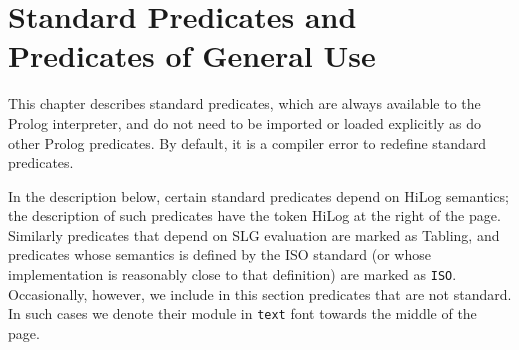 \chapter{Standard Predicates and Predicates of General Use} \label{standard}

This chapter describes standard predicates, which are always available
to the Prolog interpreter, and do not need to be imported or loaded
explicitly as do other Prolog predicates.  By default, it is a
compiler error to redefine standard predicates.  


In the description below, certain standard predicates depend on HiLog
semantics; the description of such predicates have the token {\sf
HiLog} at the right of the page.  Similarly predicates that depend on
SLG evaluation are marked as {\sf Tabling}, and predicates whose
semantics is defined by the ISO standard (or whose implementation is
reasonably close to that definition) are marked as {\tt ISO}.
Occasionally, however, we include in this section predicates that are
not standard.  In such cases we denote their module in {\tt text} font
towards the middle of the page.

